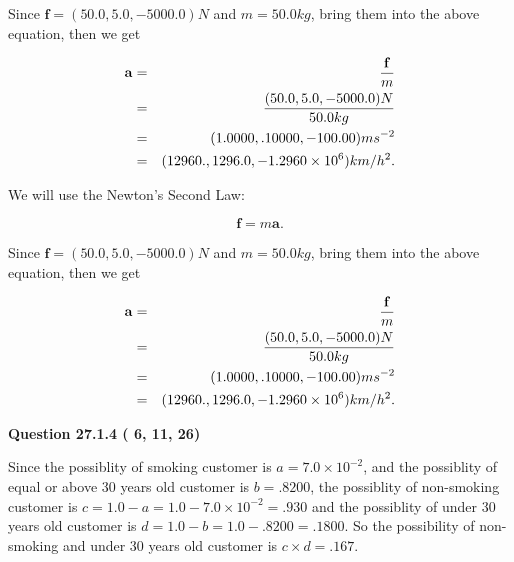 \documentclass[12pt]{article}
\begin{document}
Since $\mathbf{f}=( %
50.0,  %
5.0,  %
-5000.0 )N$
and $m= %
50.0 kg$, bring them into the above equation, then we get
 
\begin{eqnarray*}
\mathbf{a}&=&\frac{\mathbf{f}}m  \\
&=&\frac{(
50.0 ,
5.0 ,
-5000.0 )N
}{ %
50.0 kg}  \\
&=&(
1.0000 ,
.10000,
-100.00
)ms^{-2} \\
&=&(
12960. ,
1296.0 ,
-1.2960 \times 10^{6}
)km/h^2.
\end{eqnarray*}
 
 
 
 
 
\noindent{}

We will use the Newton's Second Law:
 
\[
\mathbf{f}=m\mathbf{a}.
\]
 
Since $\mathbf{f}=( %
50.0,  %
5.0,  %
-5000.0 )N$
and $m= %
50.0 kg$, bring them into the above equation, then we get
 
\begin{eqnarray*}
\mathbf{a}&=&\frac{\mathbf{f}}m  \\
&=&\frac{(
50.0 ,
5.0 ,
-5000.0 )N
}{ %
50.0 kg}  \\
&=&(
1.0000 ,
.10000,
-100.00
)ms^{-2} \\
&=&(
12960. ,
1296.0 ,
-1.2960 \times 10^{6}
)km/h^2.
\end{eqnarray*}
 
 
 
  
\vspace{0.2in}
  
{\textbf{\Large{Question
27.1.4 
 (          6,         11,         26)
}}}
  
  
 
 
\noindent{}

Since the possiblity of  %
smoking customer is $ a =  %
7.0 \times 10^{-2} $,
and the possiblity of  %
equal or above 30 years old customer is $ b =  %
.8200 $,
the possiblity of  %
non-smoking customer is $ c = 1.0 - a = 1.0 -
7.0 \times 10^{-2}
=  %
.930 $ and the possiblity of  %
under 30 years old
customer is $ d = 1.0 - b = 1.0 -  %
.8200 =  %
.1800  $.
So the possibility of  %
 non-smoking and  %
under 30 years old
customer is $ c \times d =  %
.167 $.
 
 
 
\end{document}
